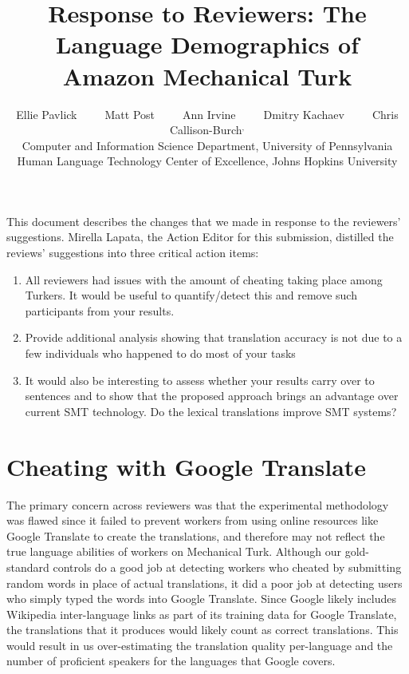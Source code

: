 \documentclass[11pt]{article}
\title{Response  to Reviewers: The Language Demographics of  Amazon Mechanical Turk}
\author{Ellie Pavlick\affliationPenn \ \ \ \ \ Matt Post\affliationJHU \ \ \ \ \ Ann Irvine\affliationJHU  \ \ \ \ \ Dmitry Kachaev\affliationJHU  \ \ \ \ \  Chris Callison-Burch\affliationPenn$^{,}$\affliationJHU \\
\affliationPenn Computer and Information Science Department, University of Pennsylvania \\
\affliationJHU Human Language Technology Center of Excellence, Johns Hopkins University \\
  }
\author{}
\date{}
\begin{document}
\maketitle

This document describes the changes that we made in response to the reviewers' suggestions.  Mirella Lapata, the Action Editor for this submission, distilled the reviews' suggestions into three critical action items:
\begin{enumerate}
\item All reviewers had issues with the amount of cheating taking place among
Turkers. It would be useful to quantify/detect this and remove such
participants from your results. 
\item Provide additional analysis showing that translation accuracy is not due
to a few individuals who happened to do most of your tasks
\item  It would also be interesting to assess
whether your results carry over to sentences and to show that the proposed approach brings an
advantage over current SMT technology.  Do the lexical translations improve
 SMT systems? 
\end{enumerate}

\section{Cheating with Google Translate}

The primary concern across reviewers was that the experimental methodology was flawed since it failed to prevent workers from using online resources like Google Translate to create the translations, and therefore may not reflect the true language abilities of workers on Mechanical Turk.  
Although our gold-standard controls do a good job at detecting workers who cheated by submitting random words in place of actual translations, it did a poor job at detecting users who simply typed the words into Google Translate.  Since Google likely includes Wikipedia inter-language links as part of its training data for Google Translate, the translations that it produces would likely count as correct translations.  This would result in us over-estimating the translation quality per-language and the number of proficient speakers for the languages that Google covers.
\end{document}
